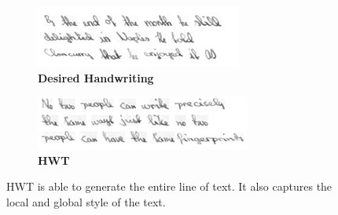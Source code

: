 \documentclass[10pt,twocolumn,letterpaper]{article}
\begin{document}
\begin{figure}[h]
  \centering
  \begin{subfigure}[b]{0.45\textwidth}
    \includegraphics[width=\textwidth]{../latex-src/Images/Gan-Input1.png}
    \caption{\textbf{Desired Handwriting}}
    \label{fig:HWT-input}
  \end{subfigure}
  \hfill
  \begin{subfigure}[b]{0.45\textwidth}
    \includegraphics[width=\textwidth]{../latex-src/Images/HWT-Output1.png}
    \caption{\textbf{HWT}}
    \label{fig:HWT-output}
  \end{subfigure}
  \caption{{HWT is able to generate the entire line of text. It also captures the local and global style of the text.}}
  \label{fig:HWT}
\end{figure}
\end{document}
